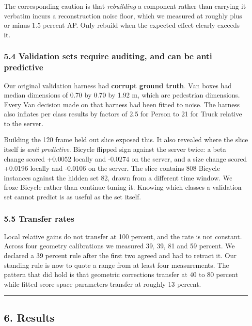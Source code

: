 \documentclass[
  10pt,
]{article}
\begin{document}
The corresponding caution is that \emph{rebuilding} a component rather
than carrying it verbatim incurs a reconstruction noise floor, which we
measured at roughly plus or minus 1.5 percent AP. Only rebuild when the
expected effect clearly exceeds it.

\subsubsection{5.4 Validation sets require auditing, and can be anti
predictive}\label{validation-sets-require-auditing-and-can-be-anti-predictive}

Our original validation harness had \textbf{corrupt ground truth}. Van
boxes had median dimensions of 0.70 by 0.70 by 1.92 m, which are
pedestrian dimensions. Every Van decision made on that harness had been
fitted to noise. The harness also inflates per class results by factors
of 2.5 for Person to 21 for Truck relative to the server.

Building the 120 frame held out slice exposed this. It also revealed
where the slice itself is \emph{anti predictive}. Bicycle flipped sign
against the server twice: a beta change scored +0.0052 locally and
-0.0274 on the server, and a size change scored +0.0196 locally and
-0.0106 on the server. The slice contains 808 Bicycle instances against
the hidden set 82, drawn from a different time window. We froze Bicycle
rather than continue tuning it. Knowing which classes a validation set
cannot predict is as useful as the set itself.

\subsubsection{5.5 Transfer rates}\label{transfer-rates}

Local relative gains do not transfer at 100 percent, and the rate is not
constant. Across four geometry calibrations we measured 39, 39, 81 and
59 percent. We declared a 39 percent rule after the first two agreed and
had to retract it. Our standing rule is now to quote a range from at
least four measurements. The pattern that did hold is that geometric
corrections transfer at 40 to 80 percent while fitted score space
parameters transfer at roughly 13 percent.

\begin{center}\rule{0.5\linewidth}{0.5pt}\end{center}

\subsection{6. Results}\label{results}
\end{document}
